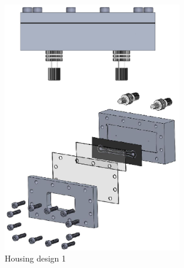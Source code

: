 \begin{figure}[ht]%
\centering
\includegraphics[width=0.7\textwidth]{figures/appendix/housingdesign1ass}%
\caption{Housing design 1}%
\label{housingdesign1ass}%
\end{figure}

\clearpage

